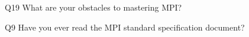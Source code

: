 \begin{description}%
\item{Q19} What are your obstacles to mastering MPI?%
\item{Q9} Have you ever read the MPI standard specification document?%
\end{description}%
